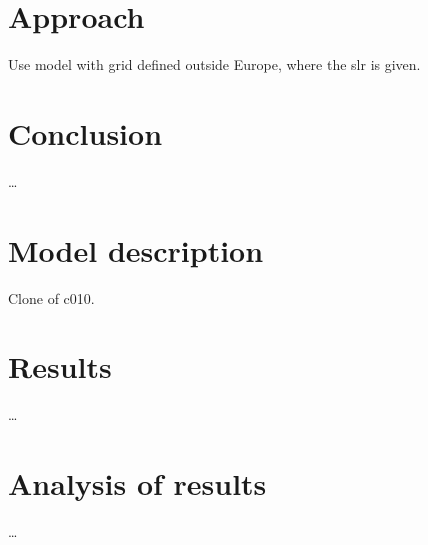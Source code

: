 \section*{Approach}
Use model with grid defined outside Europe, where the slr is given.

\section*{Conclusion} 
\ldots

\section*{Model description}

Clone of c010.

\section*{Results}
\ldots

\section*{Analysis of results}
\ldots

\printrefsegment
